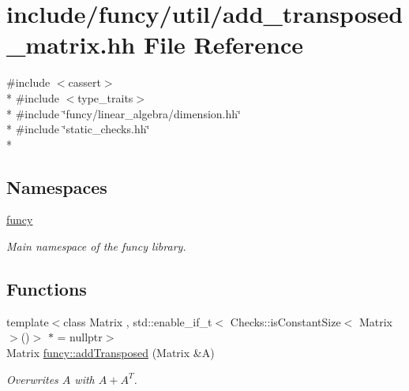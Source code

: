 \hypertarget{add__transposed__matrix_8hh}{\section{include/funcy/util/add\-\_\-transposed\-\_\-matrix.hh File Reference}
\label{add__transposed__matrix_8hh}
}
{\ttfamily \#include $<$cassert$>$}\\*
{\ttfamily \#include $<$type\-\_\-traits$>$}\\*
{\ttfamily \#include \char`\"{}funcy/linear\-\_\-algebra/dimension.\-hh\char`\"{}}\\*
{\ttfamily \#include \char`\"{}static\-\_\-checks.\-hh\char`\"{}}\\*
\subsection*{Namespaces}
\begin{DoxyCompactItemize}
\item 
\hyperlink{namespacefuncy}{funcy}
\begin{DoxyCompactList}\small\item\em Main namespace of the funcy library. \end{DoxyCompactList}\end{DoxyCompactItemize}
\subsection*{Functions}
\begin{DoxyCompactItemize}
\item 
{\footnotesize template$<$class Matrix , std\-::enable\-\_\-if\-\_\-t$<$ Checks\-::is\-Constant\-Size$<$ Matrix $>$()$>$ $\ast$  = nullptr$>$ }\\Matrix \hyperlink{namespacefuncy_a97683bec7918af0786178e7c9ec9f244}{funcy\-::add\-Transposed} (Matrix \&A)
\begin{DoxyCompactList}\small\item\em Overwrites $A$ with $A+A^T$. \end{DoxyCompactList}\end{DoxyCompactItemize}
